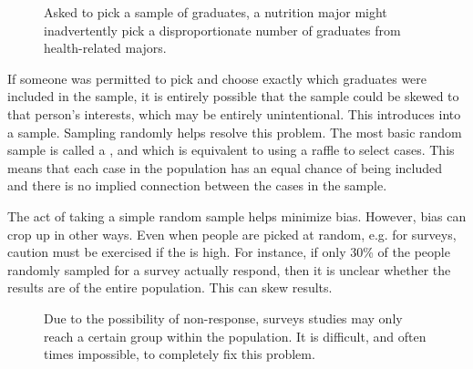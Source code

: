 \begin{figure}
  \centering
  \caption{Asked to pick a sample of graduates,
      a nutrition major might inadvertently pick a
      disproportionate number of graduates from
      health-related majors.}
  \label{popToSubSampleGraduates}
\end{figure}

\D{\newpage}

If someone was permitted to pick and choose exactly which
graduates were included in the sample, it is entirely possible
that the sample could be skewed to that person's interests,
which may be entirely unintentional.
This introduces  into a sample.
Sampling randomly helps resolve this problem.
The most basic random sample is called a
, and which is equivalent to using
a raffle to select cases.
This means that each case in the population has an equal chance
of being included and there is no implied connection between
the cases in the sample.

The act of taking a simple random sample helps minimize bias.
However, bias can crop up in other ways.
Even when people are picked at random, e.g. for surveys,
caution must be exercised if the
 is high.
For instance, if only 30\% of the people randomly sampled
for a survey actually respond, then it is unclear whether
the results are  of the entire population.
This 
 can skew results.

\begin{figure}[h]
  \centering
  \caption{Due to the possibility of non-response,
      surveys studies may only reach a certain group
      within the population.
      It is difficult, and often times impossible,
      to completely fix this problem.}
  \label{surveySample}
\end{figure}

